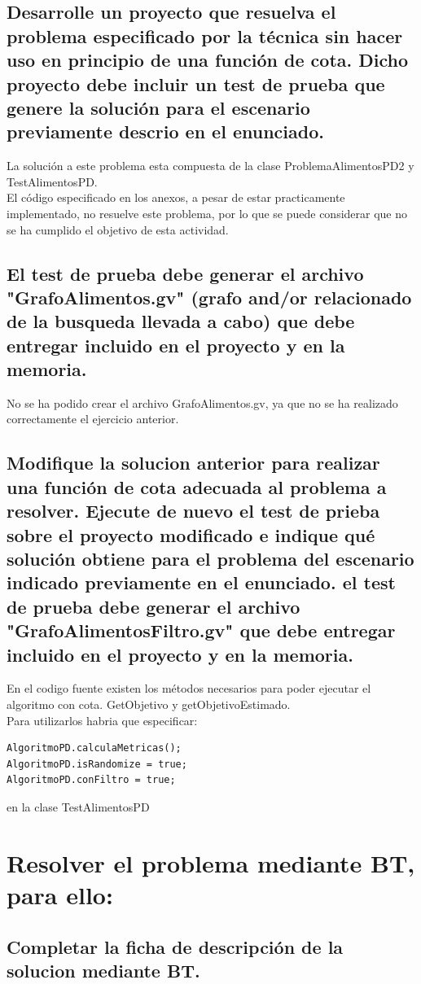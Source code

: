 \documentclass[a4paper,12pt]{article}
\begin{document}
\subsection{Desarrolle un proyecto que resuelva el problema especificado por la técnica sin hacer uso en principio de una función de cota. Dicho proyecto debe incluir un test de prueba que genere la solución para el escenario previamente descrio en el enunciado.}
La solución a este problema esta compuesta de la clase ProblemaAlimentosPD2 y TestAlimentosPD.\\
El código especificado en los anexos, a pesar de estar practicamente implementado, no resuelve este problema, por lo que se puede considerar que no se ha cumplido el objetivo de esta actividad.

\subsection{El test de prueba debe generar el archivo "GrafoAlimentos.gv" (grafo and/or relacionado de la busqueda llevada a cabo) que debe entregar incluido en el proyecto y en la memoria.}
No se ha podido crear el archivo GrafoAlimentos.gv, ya que no se ha realizado correctamente el ejercicio anterior.

\subsection{Modifique la solucion anterior para realizar una función de cota adecuada al problema a resolver. Ejecute de nuevo el test de prieba sobre el proyecto modificado e indique qué solución obtiene para el problema del escenario indicado previamente en el enunciado. el test de prueba debe generar el archivo "GrafoAlimentosFiltro.gv" que debe entregar incluido en el proyecto y en la memoria.}
En el codigo fuente existen los métodos necesarios para poder ejecutar el algoritmo con cota. GetObjetivo y getObjetivoEstimado.\\
Para utilizarlos habria que especificar:
\begin{verbatim}
AlgoritmoPD.calculaMetricas();
AlgoritmoPD.isRandomize = true;
AlgoritmoPD.conFiltro = true;
\end{verbatim}
en la clase TestAlimentosPD

\section{Resolver el problema mediante BT, para ello:}
\subsection{Completar la ficha de descripción de la solucion mediante BT.}
\end{document}
